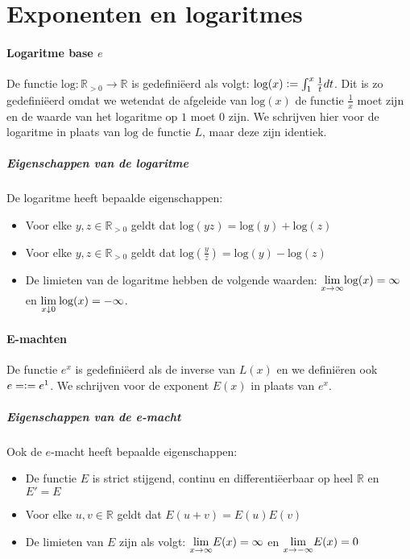 \section{Exponenten en logaritmes}
\paragraph{Logaritme base $e$} De functie $\text{log}:\mathbb{R}_{>0}\to\mathbb{R}$ is gedefiniëerd als volgt: $\text{log}(x)\vcentcolon=\int_{1}^{x}\frac{1}{t}dt$. Dit is zo gedefiniëerd omdat we \bq weten\eq dat de afgeleide van $\text{log}(x)$ de functie $\frac{1}{x}$ moet zijn en de waarde van het logaritme op $1$ moet $0$ zijn. We schrijven hier voor de logaritme in plaats van $\text{log}$ de functie $L$, maar deze zijn identiek.

\subparagraph{Eigenschappen van de logaritme} De logaritme heeft bepaalde eigenschappen:

  \begin{itemize}
    \setlength\itemsep{0em}
    \item Voor elke $y,z\in\mathbb{R}_{>0}$ geldt dat $\text{log}(yz)=\text{log}(y)+\text{log}(z)$
    \item Voor elke $y,z\in\mathbb{R}_{>0}$ geldt dat $\text{log}(\frac{y}{z})=\text{log}(y)-\text{log}(z)$
    \item De limieten van de logaritme hebben de volgende waarden: $\underset{x\to\infty}{\text{lim}}\text{log}(x)=\infty$ en $\underset{x\downarrow0}{\text{lim}}\:\text{log}(x)=-\infty$.
  \end{itemize}

\paragraph{E-machten} De functie $e^{x}$ is gedefiniëerd als de inverse van $L(x)$ en we definiëren ook $e=\vcentcolon= e^{1}$. We schrijven voor de exponent $E(x)$ in plaats van $e^{x}$.

\subparagraph{Eigenschappen van de e-macht} Ook de $e$-macht heeft bepaalde eigenschappen:

\begin{itemize}
  \setlength\itemsep{0em}
  \item De functie $E$ is strict stijgend, continu en differentiëerbaar op heel $\mathbb{R}$ en $E'=E$
  \item Voor elke $u,v\in\mathbb{R}$ geldt dat $E(u+v)=E(u)E(v)$
  \item De limieten van $E$ zijn als volgt: $\underset{x\to\infty}{\text{lim}}E(x)=\infty$ en $\underset{x\to-\infty}{\text{lim}}E(x)=0$
\end{itemize}


